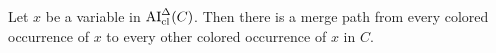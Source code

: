 \documentclass[,%
	paper=a4,%
	DIV10, %
	twoside=false,%
	liststotoc,
	bibtotoc,
	draft=false,%
	numbers=noendperiod
]{scrartcl}
\begin{document}
\begin{clemma}
	\label{lemma:arrow_from_all_colored_to_all_colored}
	Let $x$ be a variable in $\operatorname{AI}_\mathrm{cl}^\Delta(C)$.
	Then there is a merge path from every colored occurrence of $x$ to every other colored occurrence of $x$ in $C$.
\end{clemma}
\begin{comment}
	\begin{proof}

		Induction start: by definition.

		Suppose holds for $C_1$ and $C_2$, usual notation.

		We consider introductions of colored occurrences of $x$.

		\begin{description}
			\item [Suppose $x$ is introduced in $t$ by means of unification.]
				$t\sigma$ contains $x$, hence there is a variable $y$ in $t$ such that $y\sigma = s\occ{x}$.

				\cbstart
				Let $\bhat y$ be the position of $y$ which causes the variable to be changed by the unification algorithm.
				$\bhat y$ is in a resolved literal, say $l$, so we denote it by $l\at{\bhat y}$ and its counterpart in $l'$ by $l'\at{\bhat y}$
				\cbend\comm{copied}

				\begin{itemize}
					\item 
						Suppose $l\at{\bhat y}$ is a grey occurrence.
						$l'\at{\bhat y}$ is an abstraction of $s\occ{x}$.
						\mytodo{}

					\item
						Suppose $l\at{\bhat y}$ is a colored occurrence.
						Then by the induction hypothesis, $l\at{\bhat y} \mpath \bdot y$ for every other colored occurrence $\bdot y$ of $y$. As the substitution $s\occ{x}$ for $y$, there are merge edges between all these occurrences.

						For the grey occurrences of $y$ \mytodo{}

				\end{itemize}


			\item [Suppose a colored term $t\occ{x}$ containing $x$ is in $\ran(\sigma)$.]
		\end{description}

	\end{proof}
\end{comment}
\end{document}
